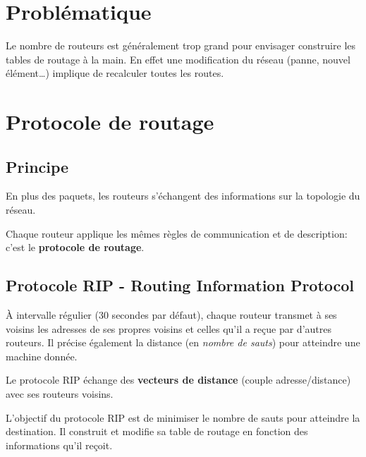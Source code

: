 \documentclass[a4paper,11pt]{article}
\begin{document}
\section{Problématique}
Le nombre de routeurs est généralement trop grand pour envisager construire les tables de routage à la main. En effet une modification du réseau (panne, nouvel élément\dots) implique de recalculer toutes les routes.
\begin{center}
\end{center}
\section{Protocole de routage}
\subsection{Principe}
En plus des paquets, les routeurs s'échangent des informations sur la topologie du réseau. 
\begin{aretenir}[]
    Chaque routeur applique les mêmes règles de communication et de description: c'est le \textbf{protocole de routage}.
\end{aretenir}
\subsection{Protocole RIP - Routing Information Protocol}
À intervalle régulier (30 secondes par défaut), chaque routeur transmet à ses voisins les adresses de ses propres voisins et celles qu'il a reçue par d'autres routeurs. Il précise également la distance (en \emph{nombre de sauts}) pour atteindre une machine donnée.
\begin{aretenir}[]
Le protocole RIP échange des \textbf{vecteurs de distance} (couple adresse/distance) avec ses routeurs voisins.
\end{aretenir}
L'objectif du protocole RIP est de minimiser le nombre de sauts pour atteindre la destination. Il construit et modifie sa table de routage en fonction des informations qu'il reçoit.
\end{document}
